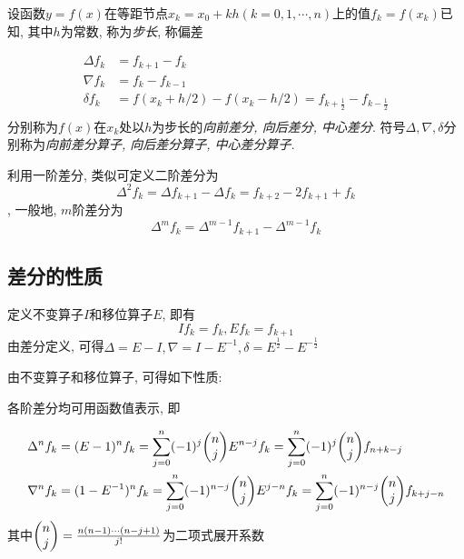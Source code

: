 \begin{definition}[差分]
    设函数$y=f(x)$在等距节点$x_k=x_0+kh(k=0,1,\cdots,n)$上的值$f_k=f(x_k)$已知, 其中$h$为常数, 称为\emph{步长}, 称偏差

    \begin{align*}
        \Delta f_k&=f_{k+1}-f_k\\
        \nabla f_k&=f_k-f_{k-1}\\
        \delta f_k&=f(x_k+h/2)-f(x_k-h/2)=f_{k+\frac{1}{2}}-f_{k-\frac{1}{2}}\\
    \end{align*}
    分别称为$f(x)$在$x_k$处以$h$为步长的\emph{向前差分, 向后差分, 中心差分}. 符号$\Delta, \nabla, \delta$分别称为\emph{向前差分算子, 向后差分算子, 中心差分算子}.
\end{definition}

利用一阶差分, 类似可定义二阶差分为
\begin{equation*}
    \Delta^2f_k=\Delta f_{k+1}-\Delta f_k=f_{k+2}-2f_{k+1}+f_k
\end{equation*},
一般地, $m$阶差分为
\begin{equation*}
    \Delta^mf_k=\Delta^{m-1}f_{k+1}-\Delta^{m-1}f_k
\end{equation*}

\subsection{差分的性质}

定义不变算子$I$和移位算子$E$, 即有
\begin{equation*}
    If_k=f_k, Ef_k=f_{k+1}
\end{equation*}
由差分定义, 可得$\Delta=E-I, \nabla=I-E^{-1}, \delta=E^{\frac{1}{2}}-E^{-\frac{1}{2}}$

由不变算子和移位算子, 可得如下性质:

各阶差分均可用函数值表示, 即

\begin{align*}
    \Delta^nf_k&=(E-1)^nf_k=\sum_{j=0}^n(-1)^j\mqty(n\\j)E^{n-j}f_k=\sum_{j=0}^n(-1)^j\mqty(n\\j)f_{n+k-j}\\
    \nabla^nf_k&=(1-E^{-1})^nf_k=\sum_{j=0}^n(-1)^{n-j}\mqty(n\\j)E^{j-n}f_k=\sum_{j=0}^n(-1)^{n-j}\mqty(n\\j)f_{k+j-n}
\end{align*}
其中$\mqty(n\\j)=\frac{n(n-1)\cdots(n-j+1)}{j!}$为二项式展开系数

